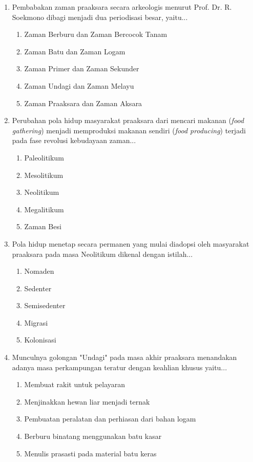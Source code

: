 \documentclass[12pt, a4paper]{article}
\begin{document}
\begin{enumerate}[label=\arabic*.]
    \item Pembabakan zaman praaksara secara arkeologis menurut Prof. Dr. R. Soekmono dibagi menjadi dua periodisasi besar, yaitu...
    \begin{enumerate}[label=\Alph*.]
        \item Zaman Berburu dan Zaman Bercocok Tanam
        \item Zaman Batu dan Zaman Logam
        \item Zaman Primer dan Zaman Sekunder
        \item Zaman Undagi dan Zaman Melayu
        \item Zaman Praaksara dan Zaman Aksara
    \end{enumerate}

    \item Perubahan pola hidup masyarakat praaksara dari mencari makanan (\textit{food gathering}) menjadi memproduksi makanan sendiri (\textit{food producing}) terjadi pada fase revolusi kebudayaan zaman...
    \begin{enumerate}[label=\Alph*.]
        \item Paleolitikum
        \item Mesolitikum
        \item Neolitikum
        \item Megalitikum
        \item Zaman Besi
    \end{enumerate}

    \item Pola hidup menetap secara permanen yang mulai diadopsi oleh masyarakat praaksara pada masa Neolitikum dikenal dengan istilah...
    \begin{enumerate}[label=\Alph*.]
        \item Nomaden
        \item Sedenter
        \item Semisedenter
        \item Migrasi
        \item Kolonisasi
    \end{enumerate}

    \item Munculnya golongan "Undagi" pada masa akhir praaksara menandakan adanya masa perkampungan teratur dengan keahlian khusus yaitu...
    \begin{enumerate}[label=\Alph*.]
        \item Membuat rakit untuk pelayaran
        \item Menjinakkan hewan liar menjadi ternak
        \item Pembuatan peralatan dan perhiasan dari bahan logam
        \item Berburu binatang menggunakan batu kasar
        \item Menulis prasasti pada material batu keras
    \end{enumerate}


\end{enumerate}
\end{document}
